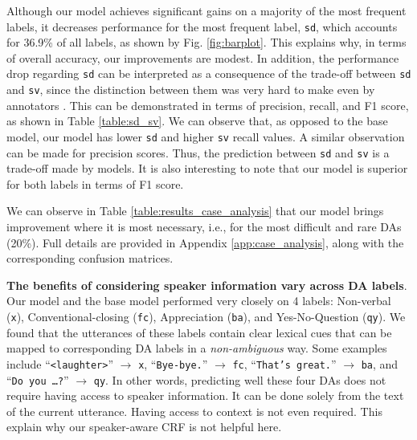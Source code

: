 \documentclass[11pt,a4paper]{article}
\begin{document}
Although our model achieves significant gains on a majority of the most frequent labels, it decreases performance for the most frequent label, \texttt{sd}, which accounts for 36.9\% of all labels, as shown by Fig. \ref{fig:barplot}.
This explains why, in terms of overall accuracy, our improvements are modest.
In addition, the performance drop regarding \texttt{sd} can be interpreted as a consequence of the trade-off between \texttt{sd} and \texttt{sv}, since the distinction between them was very hard to make even by annotators \citep{jurafsky1997switchboard}.
This can be demonstrated in terms of precision, recall, and F1 score, as shown in Table \ref{table:sd_sv}.
We can observe that, as opposed to the base model, our model has lower \texttt{sd} and higher \texttt{sv} recall values.
A similar observation can be made for precision scores.
Thus, the prediction between \texttt{sd} and \texttt{sv} is a trade-off made by models.
It is also interesting to note that our model is superior for both labels in terms of F1 score.

\begin{table}[ht]
\small
\centering
\setlength{\tabcolsep}{4pt} \renewcommand{\arraystretch}{1.2} 
\caption{Average accuracy (\%) of our model vs. base model on the 10 DAs best and worst predicted by our model (resp. representing 20\% and 40\% of all annotations).}
\label{table:results_case_analysis}
\end{table}

We can observe in Table \ref{table:results_case_analysis} that our model brings improvement where it is most necessary, i.e., for the most difficult and rare DAs (20\%).
Full details are provided in Appendix \ref{app:case_analysis}, along with the corresponding confusion matrices.

\noindent \textbf{The benefits of considering speaker information vary across DA labels}.
Our model and the base model performed very closely on 4 labels: Non-verbal (\texttt{x}), Conventional-closing (\texttt{fc}), Appreciation (\texttt{ba}), and Yes-No-Question (\texttt{qy}).
We found that the utterances of these labels contain clear lexical cues that can be mapped to corresponding DA labels in a \textit{non-ambiguous} way.
Some examples include ``{\small \texttt{<laughter>}}'' $\rightarrow$ \texttt{x},  ``{\small \texttt{Bye-bye.}}'' $\rightarrow$ \texttt{fc},  ``{\small \texttt{That's great.}}'' $\rightarrow$ \texttt{ba}, and ``{\small \texttt{Do you \dots ?}}'' $\rightarrow$ \texttt{qy}. 
In other words, predicting well these four DAs does not require having access to speaker information.
It can be done solely from the text of the current utterance.
Having access to context is not even required.
This explain why our speaker-aware CRF is not helpful here.
\end{document}
